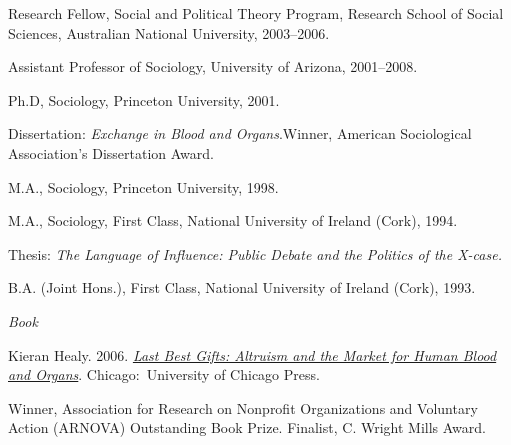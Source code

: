 \documentclass[11pt,article,oneside]{memoir}
\begin{document}
\ind Research Fellow, Social and Political Theory Program,
Research School of Social Sciences, Australian National University, 2003--2006.

\ind Assistant Professor of Sociology, University of Arizona, 2001--2008.

\bigskip




\ind Ph.D, Sociology, Princeton University, 2001.

\ind \hspace{0.35in} \footnotesize Dissertation: \emph{Exchange in Blood and Organs}.\newline Winner, American Sociological Association's Dissertation Award.\normalsize \vspace{0.05in}

\ind M.A., Sociology, Princeton University, 1998. 


\ind M.A., Sociology, First Class, National University of Ireland (Cork), 1994.

\ind \hspace{0.35in} \footnotesize Thesis: \emph{The Language of Influence: Public Debate and the Politics of the X-case.} \normalsize \vspace{0.01in}

\ind B.A. (Joint Hons.), First Class, National University of Ireland (Cork), 1993.

\bigskip
 
\medskip
\noindent\emph{Book \vspace{0.01in}}

\ind  Kieran Healy. 2006. \emph{\href{http://www.lastbestgifts.com}{Last Best Gifts: Altruism and the Market for Human Blood and Organs}}. Chicago:~University of Chicago Press. \vspace{0.05in}

\ind \hspace{0.35in} \footnotesize Winner, Association for Research on Nonprofit Organizations and Voluntary Action (ARNOVA) Outstanding Book Prize. Finalist, C. Wright Mills Award. 
\end{document}
